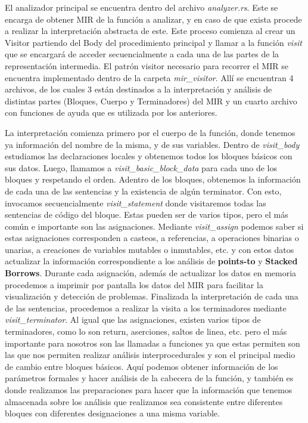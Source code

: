 El analizador principal se encuentra dentro del archivo \textit{analyzer.rs}. Este se encarga de obtener MIR de la función a analizar, y en caso de que exista procede a realizar la interpretación abstracta de este. Este proceso comienza al crear un Visitor partiendo del Body del procedimiento principal y llamar a la función \textit{visit} que se encargará de acceder secuencialmente a cada una de las partes de la representación intermedia. El patrón visitor necesario para recorrer el MIR se encuentra implementado dentro de la carpeta \textit{mir\_visitor}. Allí se encuentran 4 archivos, de los cuales 3 están destinados a la interpretación y análisis de distintas partes (Bloques, Cuerpo y Terminadores) del MIR y un cuarto archivo con funciones de ayuda que es utilizada por los anteriores.

La interpretación comienza primero por el cuerpo de la función, donde tenemos ya información del nombre de la misma, y de sus variables. Dentro de \textit{visit\_body} estudiamos las declaraciones locales y obtenemos todos los bloques básicos con sus datos. Luego, llamamos a \textit{visit\_basic\_block\_data} para cada uno de los bloques y respetando el orden. Adentro de los bloques, obtenemos la información de cada una de las sentencias y la existencia de algún terminator. Con esto, invocamos secuencialmente \textit{visit\_statement} donde visitaremos todas las sentencias de código del bloque. Estas pueden ser de varios tipos, pero el más común e importante son las asignaciones. Mediante \textit{visit\_assign} podemos saber si estas asignaciones corresponden a casteos, a referencias, a operaciones binarias o unarias, a creaciones de variables mutables o inmutables, etc. y con estos datos actualizar la información correspondiente a los análisis de \textbf{points-to} y \textbf{Stacked Borrows}. Durante cada asignación, además de actualizar los datos en memoria procedemos a imprimir por pantalla los datos del MIR para facilitar la visualización y detección de problemas. Finalizada la interpretación de cada una de las sentencias, procedemos a realizar la visita a los terminadores mediante \textit{visit\_terminator}. Al igual que las asignaciones, existen varios tipos de terminadores, como lo son return, aserciones, saltos de linea, etc. pero el más importante para nosotros son las llamadas a funciones ya que estas permiten son las que nos permiten realizar análisis interprocedurales y son el principal medio de cambio entre bloques básicos. Aquí podemos obtener información de los parámetros formales y hacer análisis de la cabecera de la función, y también es donde realizamos las preparaciones para hacer que la información que tenemos almacenada sobre los análisis que realizamos sea consistente entre diferentes bloques con diferentes designaciones a una misma variable.

